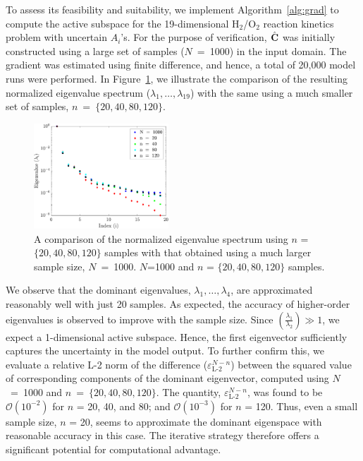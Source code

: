To assess its feasibility and suitability, we implement
Algorithm~\ref{alg:grad} to compute the active subspace for 
the 19-dimensional H$_2$/O$_2$ reaction kinetics
problem with uncertain $A_i$'s. For the purpose of verification,
$\hat{\mathbf{{C}}}$ was initially constructed using a large set of samples
($N$~=~1000) in the input domain. The gradient was estimated using
finite difference, and hence, a total of 20,000 model runs were performed. 
In Figure~\ref{fig:eig_comp}, we illustrate the comparison of
the resulting normalized eigenvalue spectrum ($\lambda_1, \ldots, 
\lambda_{19}$) with the same using a much 
smaller set of samples, $n$~=~$\{20,40,80,120\}$.
%
\begin{figure}[htbp]
 \begin{center}
  \includegraphics[width=0.45\textwidth]{./Figures/eig_comp}
\caption{A comparison of the normalized eigenvalue spectrum using $n$ = $\{20,40,80,120\}$ samples with that
obtained using a much larger sample size, $N$~=~1000. 
$N$=1000 and $n$ = $\{20,40,80,120\}$ samples.
} 
\label{fig:eig_comp}
\end{center}
\end{figure}
%
We observe that the dominant eigenvalues, $\lambda_1, \ldots, \lambda_4$, 
are approximated 
reasonably well with just 20 samples. As expected, the accuracy of higher-order eigenvalues is observed
to improve with the sample size. Since 
$\left(\frac{\lambda_1}{\lambda_2}\right)\gg 1$, we expect 
a 1-dimensional active subspace. Hence, the first eigenvector 
sufficiently captures the uncertainty in
the  model output. To further confirm this, we evaluate a relative L-2 norm of the difference
 ($\varepsilon_\text{L-2}^{N-n}$) between the 
squared value of corresponding components of the dominant eigenvector, computed using $N$~=~1000
and $n$~=~$\{20,40,80,120\}$.  The quantity, $\varepsilon_\text{L-2}^{N-n}$, was found to be 
$\mathcal{O}(10^{-2})$ for $n$ = 20, 40, and 80; and $\mathcal{O}(10^{-3})$ for $n$ = 120.
Thus, even a small sample size, $n$ = 20, seems to approximate the dominant eigenspace with
reasonable accuracy in this case. 
The iterative strategy therefore offers a significant potential for computational advantage. 


